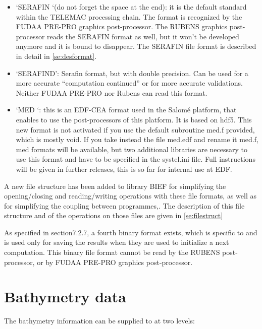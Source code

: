 \begin{itemize}
\item  `SERAFIN `(do not forget the space at the end): it is the default standard within the TELEMAC processing chain. The format is recognized by the FUDAA PRE-PRO graphics post-processor. The RUBENS graphics post-processor reads the SERAFIN format as well, but it won't be developed anymore and it is bound to disappear. The SERAFIN file format is described in detail in \ref{se:desformat}.

\item  `SERAFIND': Serafin format, but with double precision. Can be used for a more accurate ``computation continued'' or for more accurate validations. Neither FUDAA PRE-PRO nor Rubens can read this format.

\item  `MED  `: this is an EDF-CEA format used in the Salomé platform, that enables to use the post-processors of this platform. It is based on hdf5. This new format is not activated if you use the default subroutine med.f provided, which is mostly void. If you take instead the file med.edf and rename it med.f, med formats will be available, but two additional libraries are necessary to use this format and have to be specified in the systel.ini file. Full instructions will be given in further releases, this is so far for internal use at EDF.
\end{itemize}

 A new file structure has been added to library BIEF for simplifying the opening/closing and reading/writing operations with these file formats, as well as for simplifying the coupling between programmes,. The description of this file structure and of the operations on those files are given in \ref{se:filestruct}

 As specified in section7.2.7, a fourth binary format exists, which is specific to \tomawac and is used only for saving the results when they are used to initialize a next computation. This binary file format cannot be read by the RUBENS post-processor, or by FUDAA PRE-PRO graphics post-processor.


\section{ Bathymetry data }
\label{se:bathydata}
 The bathymetry information can be supplied to \tomawac at two levels:

